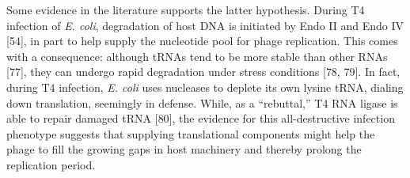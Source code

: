 \documentclass[12pt,twoside]{mitthesis-manusdown}
\begin{document}
Some evidence in the literature supports the latter hypothesis. During
T4 infection of \emph{E. coli}, degradation of host DNA is initiated by
Endo II and Endo IV {[}54{]}, in part to help supply the nucleotide pool
for phage replication. This comes with a consequence: although tRNAs
tend to be more stable than other RNAs {[}77{]}, they can undergo rapid
degradation under stress conditions {[}78, 79{]}. In fact, during T4
infection, \emph{E. coli} uses nucleases to deplete its own lysine tRNA,
dialing down translation, seemingly in defense. While, as a
``rebuttal,'' T4 RNA ligase is able to repair damaged tRNA {[}80{]}, the
evidence for this all-destructive infection phenotype suggests that
supplying translational components might help the phage to fill the
growing gaps in host machinery and thereby prolong the replication
period.
\end{document}
